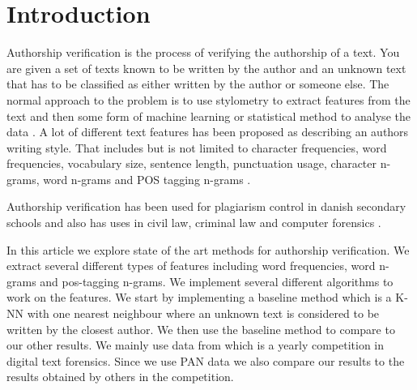 \section{Introduction}
Authorship verification is the process of verifying the authorship of a text.
You are given a set of texts known to be written by the author and an unknown
text that has to be classified as either written by the author or someone else.
The normal approach to the problem is to use stylometry to extract features from
the text and then some form of machine learning or statistical method to analyse
the data \cite{stamatos2009}. A lot of different text features has been proposed
as describing an authors writing style. That includes but is not limited to
character frequencies, word frequencies, vocabulary size, sentence length,
punctuation usage, character n-grams, word n-grams and \gls{POS} tagging n-grams
\cite{stamatos2009}.

Authorship verification has been used for plagiarism control in danish secondary
schools \cite{hansen2014} and also has uses in civil law, criminal law and
computer forensics \cite{stamatos2009}.

In this article we explore state of the art methods for authorship verification.
We extract several different types of features including word frequencies, word
n-grams and pos-tagging n-grams. We implement several different algorithms to
work on the features. We start by implementing a baseline method which is a K-NN
with one nearest neighbour where an unknown text is considered to be written
by the closest author. We then use the baseline method to compare to our other
results. We mainly use data from \cite{pan:2015} which is a yearly competition
in digital text forensics. Since we use PAN data we also compare our results to
the results obtained by others in the competition.
